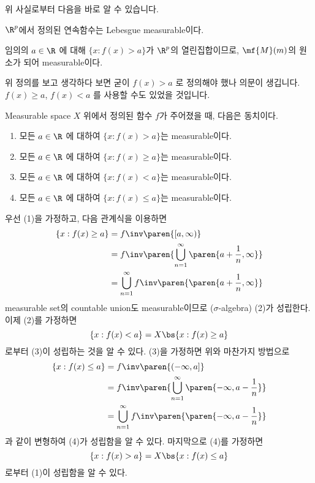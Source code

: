 위 사실로부터 다음을 바로 알 수 있습니다.

\cor \(\R^p\)에서 정의된 연속함수는 Lebesgue measurable이다.

\pf 임의의 \(a \in \R\) 에 대해 \(\{x : f(x) > a\}\)가 \(\R^p\)의 열린집합이므로, \(\mf{M}(m)\)의 원소가 되어 measurable이다.

위 정의를 보고 생각하다 보면 굳이 \(f(x) > a\) 로 정의해야 했나 의문이 생깁니다. \(f(x) \geq a\), \(f(x) < a\) 를 사용할 수도 있었을 것입니다.

 Measurable space \(X\) 위에서 정의된 함수 \(f\)가 주어졌을 때, 다음은 동치이다.
\begin{enumerate}
    \item 모든 \(a \in \R\) 에 대하여 \(\{x : f(x) > a\}\)는 measurable이다.
    \item 모든 \(a \in \R\) 에 대하여 \(\{x : f(x) \geq a\}\)는 measurable이다.
    \item 모든 \(a \in \R\) 에 대하여 \(\{x : f(x) < a\}\)는 measurable이다.
    \item 모든 \(a \in \R\) 에 대하여 \(\{x : f(x) \leq a\}\)는 measurable이다.
\end{enumerate}

\pf 우선 (1)을 가정하고, 다음 관계식을 이용하면
\begin{equation*}
    \begin{aligned}
        \{x : f(x) \geq a\} & = f\inv\paren{[a, \infty)}                                            \\
                            & = f\inv\paren{\bigcup_{n=1}^{\infty} \paren{a + \frac{1}{n}, \infty}} \\
                            & = \bigcup_{n=1}^{\infty} f\inv\paren{\paren{a + \frac{1}{n}, \infty}}
    \end{aligned}
\end{equation*}
measurable set의 countable union도 measurable이므로 (\(\sigma\)-algebra) (2)가 성립한다. 이제 (2)를 가정하면
\[
    \{x : f(x) < a\} = X \bs \{x : f(x) \geq a\}
\]
로부터 (3)이 성립하는 것을 알 수 있다. (3)을 가정하면 위와 마찬가지 방법으로
\[
    \begin{aligned}
        \{x : f(x) \leq a\} & = f\inv \paren{(-\infty, a]}                                           \\
                            & = f\inv\paren{\bigcup_{n=1}^{\infty} \paren{-\infty, a - \frac{1}{n}}} \\
                            & = \bigcup_{n=1}^{\infty} f\inv\paren{\paren{-\infty, a - \frac{1}{n}}}
    \end{aligned}
\]
과 같이 변형하여 (4)가 성립함을 알 수 있다. 마지막으로 (4)를 가정하면
\[
    \{x : f(x) > a\} = X \bs \{x : f(x) \leq a\}
\]
로부터 (1)이 성립함을 알 수 있다.

